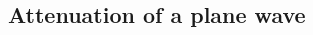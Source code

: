 \documentclass[a4paper, 11pt, landscape]{article}
\begin{document}
\begin{multicols*}{3}
\subsection{Attenuation of a plane wave}
\begin{compactenum}

\end{compactenum}




\raggedcolumns
\end{multicols*}
\end{document}
